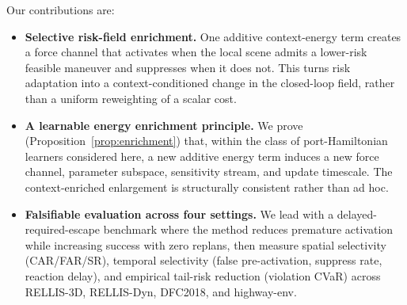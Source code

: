 
Our contributions are:
\begin{itemize}
  \item \textbf{Selective risk-field enrichment.} One additive
        context-energy term creates a force channel that activates
        when the local scene admits a lower-risk feasible maneuver and
        suppresses when it does not. This turns risk adaptation into a
        context-conditioned change in the closed-loop field, rather
        than a uniform reweighting of a scalar cost.

  \item \textbf{A learnable energy enrichment principle.} We prove
        (Proposition~\ref{prop:enrichment}) that, within the class of
        port-Hamiltonian learners considered here, a new additive
        energy term induces a new force channel, parameter subspace,
        sensitivity stream, and update timescale. The context-enriched
        enlargement is structurally consistent rather than ad hoc.

  \item \textbf{Falsifiable evaluation across four settings.} We lead with a
        delayed-required-escape benchmark where the method reduces premature
        activation while increasing success with zero replans, then measure
        spatial selectivity (CAR/FAR/SR), temporal selectivity (false
        pre-activation, suppress rate, reaction delay), and empirical
        tail-risk reduction (violation CVaR) across RELLIS-3D, RELLIS-Dyn,
        DFC2018, and highway-env.
\end{itemize}

